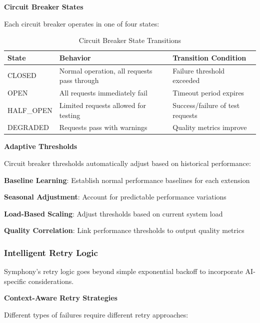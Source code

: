 \textbf{Circuit Breaker States}

Each circuit breaker operates in one of four states:

\begin{table}[h]
\centering
\caption{Circuit Breaker State Transitions}
\label{tab:circuit-breaker-states}
\begin{tabular}{@{}lll@{}}
\toprule
\textbf{State} & \textbf{Behavior} & \textbf{Transition Condition} \\
\midrule
CLOSED & Normal operation, all requests pass through & Failure threshold exceeded \\
OPEN & All requests immediately fail & Timeout period expires \\
HALF\_OPEN & Limited requests allowed for testing & Success/failure of test requests \\
DEGRADED & Requests pass with warnings & Quality metrics improve \\
\bottomrule
\end{tabular}
\end{table}

\textbf{Adaptive Thresholds}

Circuit breaker thresholds automatically adjust based on historical performance:

\begin{compactlist}
    \item \textbf{Baseline Learning}: Establish normal performance baselines for each extension
    \item \textbf{Seasonal Adjustment}: Account for predictable performance variations
    \item \textbf{Load-Based Scaling}: Adjust thresholds based on current system load
    \item \textbf{Quality Correlation}: Link performance thresholds to output quality metrics
\end{compactlist}

\subsubsection{Intelligent Retry Logic}

Symphony's retry logic goes beyond simple exponential backoff to incorporate AI-specific considerations.

\textbf{Context-Aware Retry Strategies}

Different types of failures require different retry approaches:

